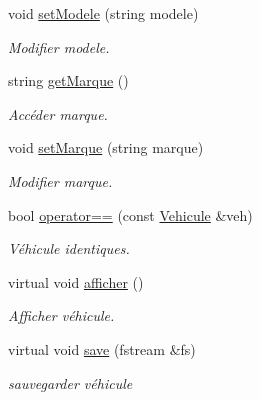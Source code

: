 \begin{DoxyCompactItemize}
void \hyperlink{class_vehicule_ad348c1bb4e7c824e7c66bbcde4684f1c}{setModele} (string modele)
\begin{DoxyCompactList}\small\item\em Modifier modele. \item\end{DoxyCompactList}\item 
string \hyperlink{class_vehicule_aca7733632f1a0f1f56d76726895a8c78}{getMarque} ()
\begin{DoxyCompactList}\small\item\em Accéder marque. \item\end{DoxyCompactList}\item 
void \hyperlink{class_vehicule_a9d21c0745b912c046e712a303851d69b}{setMarque} (string marque)
\begin{DoxyCompactList}\small\item\em Modifier marque. \item\end{DoxyCompactList}\item 
bool \hyperlink{class_vehicule_afa55989329da4544093cad8e99b2f3b2}{operator==} (const \hyperlink{class_vehicule}{Vehicule} \&veh)
\begin{DoxyCompactList}\small\item\em Véhicule identiques. \item\end{DoxyCompactList}\item 
virtual void \hyperlink{class_vehicule_aa83469d5e8e5fa9844cc52698b8ddf76}{afficher} ()
\begin{DoxyCompactList}\small\item\em Afficher véhicule. \item\end{DoxyCompactList}\item 
virtual void \hyperlink{class_vehicule_a197353085208f6ceaf70c8e0303e4581}{save} (fstream \&fs)
\begin{DoxyCompactList}\small\item\em sauvegarder véhicule \item\end{DoxyCompactList}\end{DoxyCompactItemize}


